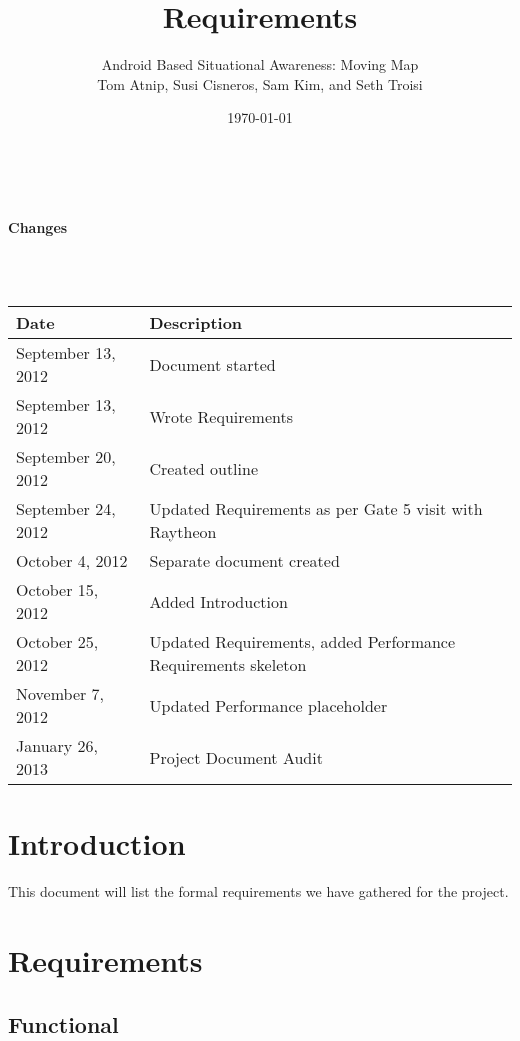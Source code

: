 \documentclass{article}
\begin{document}
\setlength{\voffset}{3.5in}
\title{Requirements}
\author{\Large Android Based Situational Awareness: Moving Map\\
Tom Atnip, Susi Cisneros, Sam Kim, and Seth Troisi}
\date{\today}
\maketitle
\clearpage
\setlength{\voffset}{0pt}
\tableofcontents
\clearpage
~\\
\begin{Large}\textbf{Changes}\end{Large}\\
~\\
\begin{tabular}{ | p{1.5in} | p{4.5in} | }
\hline
\textbf{Date} & \textbf{Description}\\
\hline
\hline
September 13, 2012 & Document started\\
\hline
September 13, 2012 & Wrote Requirements\\
\hline
September 20, 2012 & Created outline\\
\hline
September 24, 2012 & Updated Requirements as per Gate 5 visit with Raytheon\\
\hline
October 4, 2012 & Separate document created\\
\hline
October 15, 2012 & Added Introduction\\
\hline
October 25, 2012 & Updated Requirements, added Performance Requirements skeleton\\
\hline
November 7, 2012 & Updated Performance placeholder\\
\hline
January 26, 2013 & Project Document Audit\\
\hline
\end{tabular}
\clearpage

\section{Introduction}
This document will list the formal requirements we have gathered for the project.


\section{Requirements}

\subsection{Functional}
\end{document}
